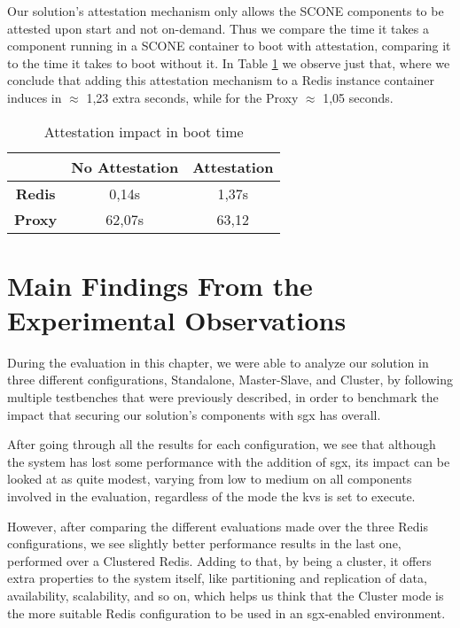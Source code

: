 Our solution's attestation mechanism only allows the SCONE components to be attested upon start and not on-demand. Thus we compare the time it takes a component running in a SCONE container to boot with attestation, comparing it to the time it takes to boot without it. In Table \ref{table:attestationImpactBoot} we observe just that, where we conclude that adding this attestation mechanism to a Redis instance container induces in $\approx$ 1,23 extra seconds, while for the Proxy $\approx$ 1,05 seconds.

\begin{table}[ht]
	\caption{Attestation impact in boot time} %
	\centering %
	\begin{tabular}{c c c} %
		\hline\hline %
		\textbf{} & \textbf{No Attestation} & \textbf{Attestation} \\ [0.5ex] %
		\hline
		\textbf{Redis} & 0,14s & 1,37s\\
		\hline %
		\textbf{Proxy} & 62,07s & 63,12\\ [1ex] %
		\hline %
	\end{tabular}
	\label{table:attestationImpactBoot} %
\end{table}

\section{Main Findings From the Experimental Observations}

During the evaluation in this chapter, we were able to analyze our solution in three different configurations, Standalone, Master-Slave, and Cluster, by following multiple testbenches that were previously described, in order to benchmark the impact that securing our solution's components with \gls{sgx} has overall. 

After going through all the results for each configuration, we see that although the system has lost some performance with the addition of \gls{sgx}, its impact can be looked at as quite modest, varying from low to medium on all components involved in the evaluation, regardless of the mode the \gls{kvs} is set to execute. 

However, after comparing the different evaluations made over the three Redis configurations, we see slightly better performance results in the last one, performed over a Clustered Redis. Adding to that, by being a cluster, it offers extra properties to the system itself, like partitioning and replication of data, availability, scalability, and so on, which helps us think that the Cluster mode is the more suitable Redis configuration to be used in an \gls{sgx}-enabled environment.


